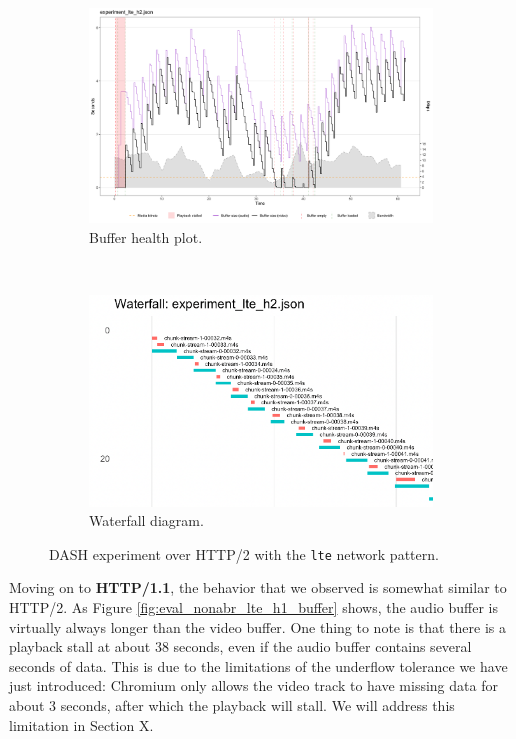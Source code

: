 \begin{figure}[h]
	\centering
	
	\begin{subfigure}[t]{0.45\textwidth}
		\centering
		\includegraphics[width=\textwidth]{res/eval_nonabr_lte_h2.png}
		\caption{Buffer health plot.}
		\label{fig:eval_nonabr_lte_h2_buffer}
	\end{subfigure}%
	~ 
	\begin{subfigure}[t]{0.45\textwidth}
		\centering
		\includegraphics[width=\textwidth]{res/eval_nonabr_lte_h2_waterfall.png}
		\caption{Waterfall diagram.}
		\label{fig:eval_nonabr_lte_h2_waterfall}
	\end{subfigure}
	
	\caption{DASH experiment over HTTP/2 with the \texttt{lte} network pattern.}
	\label{fig:eval_nonabr_lte_h2}
\end{figure}

Moving on to \textbf{HTTP/1.1}, the behavior that we observed is somewhat similar to HTTP/2. As Figure \ref{fig:eval_nonabr_lte_h1_buffer} shows, the audio buffer is virtually always longer than the video buffer. One thing to note is that there is a playback stall at about 38 seconds, even if the audio buffer contains several seconds of data. This is due to the limitations of the underflow tolerance we have just introduced: Chromium only allows the video track to have missing data for about 3 seconds, after which the playback will stall. We will address this limitation in Section X.

